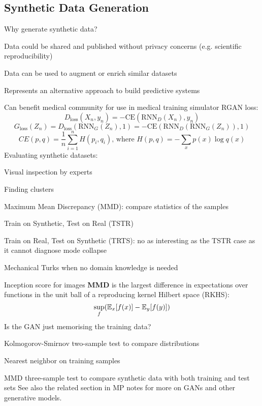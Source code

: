 \documentclass[12pt]{article}
\begin{document}
\subsection{Synthetic Data Generation}
Why generate synthetic data?
\ulb
\item Data could be shared and published without privacy concerns (e.g. scientific reproducibility)
\item Data can be used to augment or enrich similar datasets
\item Represents an alternative approach to build predictive systems
\item Can benefit medical community for use in medical training simulator
\ule
RGAN loss:
\[ D_{\text{loss}}(X_n, y_n) = -\text{CE}(\text{RNN}_D(X_n),y_n) \]
\[ G_{\text{loss}}(Z_n) = D_{\text{loss}}(\text{RNN}_G(Z_n),1) = -\text{CE}(\text{RNN}_D(\text{RNN}_G(Z_n)),1) \]
\[ CE(p,q) = \frac{1}{n} \sum_{i=1}^n H(p_i,q_i) \text{, where } H(p,q) = -\sum_{x} p(x) \log q(x) \]
Evaluating synthetic datasets:
\ulb
\item Visual inspection by experts
\item Finding clusters
\item Maximum Mean Discrepancy (MMD): compare statistics of the samples
\item Train on Synthetic, Test on Real (TSTR)
\item Train on Real, Test on Synthetic (TRTS): no as interesting as the TSTR case as it cannot diagnose mode collapse
\item Mechanical Turks when no domain knowledge is needed
\item Inception score for images
\ule
\textbf{MMD} is the largest difference in expectations over functions in the unit ball of a reproducing kernel Hilbert space (RKHS):
\[ \sup_f ( \operatorname{\mathbb{E}}_x[f(x)] - \operatorname{\mathbb{E}}_y[f(y)] ) \]
Is the GAN just memorising the training data?
\ulb
\item Kolmogorov-Smirnov two-sample test to compare distributions
\item Nearest neighbor on training samples
\item MMD three-sample test to compare synthetic data with both training and test sets
\ule
See also the related section in MP notes for more on GANs and other generative models.
\end{document}
